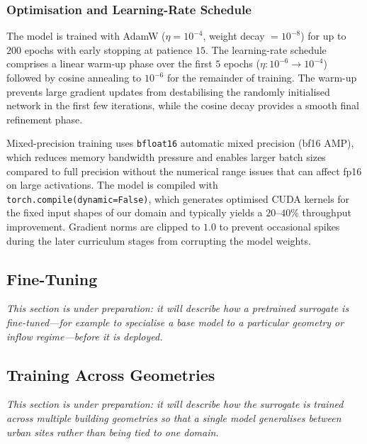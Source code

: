 \subsubsection{Optimisation and Learning-Rate Schedule}
\label{sec:optim}

The model is trained with AdamW ($\eta = 10^{-4}$, weight decay $= 10^{-8}$)
for up to $200$ epochs with early stopping at patience $15$. The learning-rate
schedule comprises a linear warm-up phase over the first $5$ epochs
($\eta: 10^{-6} \to 10^{-4}$) followed by cosine annealing to $10^{-6}$
for the remainder of training. The warm-up prevents large gradient updates
from destabilising the randomly initialised network in the first few iterations,
while the cosine decay provides a smooth final refinement phase.

Mixed-precision training uses \texttt{bfloat16} automatic mixed precision
(bf16 AMP), which reduces memory bandwidth pressure and enables larger batch
sizes compared to full precision without the numerical range issues that can
affect fp16 on large activations. The model is compiled with
\texttt{torch.compile(dynamic=False)}, which generates optimised CUDA kernels
for the fixed input shapes of our domain and typically yields a $20$--$40\%$
throughput improvement. Gradient norms are clipped to $1.0$ to prevent
occasional spikes during the later curriculum stages from corrupting the model
weights.

\subsection{Fine-Tuning}
\label{sec:finetuning}

\textit{This section is under preparation: it will describe how a pretrained
surrogate is fine-tuned---for example to specialise a base model to a particular
geometry or inflow regime---before it is deployed.}

\subsection{Training Across Geometries}
\label{sec:multigeom}

\textit{This section is under preparation: it will describe how the surrogate is
trained across multiple building geometries so that a single model generalises
between urban sites rather than being tied to one domain.}

